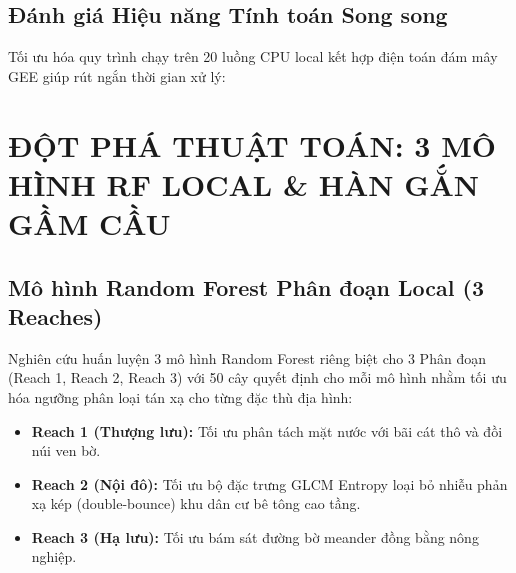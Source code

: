 \documentclass[11pt,a4paper]{article}
\begin{document}
\subsection{Đánh giá Hiệu năng Tính toán Song song}
Tối ưu hóa quy trình chạy trên 20 luồng CPU local kết hợp điện toán đám mây GEE giúp rút ngắn thời gian xử lý:

\begin{table}[H]
\centering
\caption{Đánh giá hiệu năng xử lý tính toán song song chuỗi thời gian 317 cảnh ảnh SAR.}
\label{tab:benchmark}
\end{table}

\section{ĐỘT PHÁ THUẬT TOÁN: 3 MÔ HÌNH RF LOCAL \& HÀN GẮN GẦM CẦU}

\subsection{Mô hình Random Forest Phân đoạn Local (3 Reaches)}
Nghiên cứu huấn luyện 3 mô hình Random Forest riêng biệt cho 3 Phân đoạn (Reach 1, Reach 2, Reach 3) với 50 cây quyết định cho mỗi mô hình nhằm tối ưu hóa ngưỡng phân loại tán xạ cho từng đặc thù địa hình:
\begin{itemize}
    \item \textbf{Reach 1 (Thượng lưu):} Tối ưu phân tách mặt nước với bãi cát thô và đồi núi ven bờ.
    \item \textbf{Reach 2 (Nội đô):} Tối ưu bộ đặc trưng GLCM Entropy loại bỏ nhiễu phản xạ kép (double-bounce) khu dân cư bê tông cao tầng.
    \item \textbf{Reach 3 (Hạ lưu):} Tối ưu bám sát đường bờ meander đồng bằng nông nghiệp.
\end{itemize}
\end{document}
